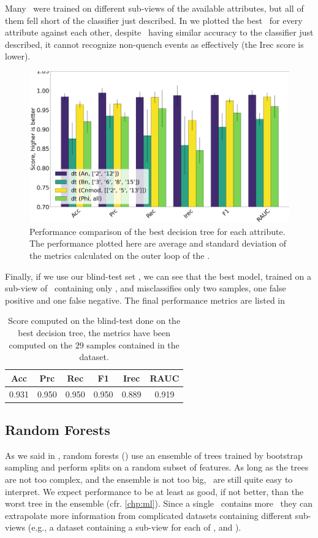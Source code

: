 Many \dts\ were trained on different sub-views of the available attributes, but all of them fell short
of the classifier just described. In  we plotted the best \dt\ for every
attribute against each other, despite \cnmod\ having similar accuracy to the classifier just
described, it cannot recognize non-quench events as effectively (the Irec score is lower).
\begin{figure}[!ht]
	\centering
	\includegraphics[width=0.7\linewidth]{img/best_dts.png}
	\caption{Performance comparison of the best decision tree for each attribute. The
		performance plotted here are average and standard deviation of the metrics calculated on the
		outer loop of the \ncv.} \label{fig:best-dts}
\end{figure}

Finally, if we use our blind-test set \db, we can see that the best model, trained on a sub-view of
\an\ containing only \an[2], and \an[12] misclassifies only two samples, one false positive and one
false negative. The final performance metrics are listed in 
\begin{table}[!ht]
	\setlength{\tabcolsep}{6pt}
	\centering
	\begin{tabular}{cccccc}
		\toprule
		\textbf{Acc} & \textbf{Prc} & \textbf{Rec} & \textbf{F1} & \textbf{Irec} & \textbf{RAUC} \\
		\midrule
		0.931        & 0.950        & 0.950        & 0.950       & 0.889         & 0.919         \\
		\bottomrule
	\end{tabular}
	\caption{Score computed on the blind-test done on the best decision tree, the metrics have
		been computed on the $29$ samples contained in the dataset.}\label{tbl:blind-test-bdt}
\end{table}

\subsection{Random Forests}
\label{sec:qrp-rf}
As we said in , random forests (\rfs) use an ensemble of trees trained by bootstrap
sampling and perform splits on a random subset of features. As long as the trees are not too
complex, and the ensemble is not too big, \rfs\ are still quite easy to interpret. We expect
performance to be at least as good, if not better, than the worst tree in the ensemble (cfr.
\cref{chp:ml}). Since a single \rf\ contains more \dts\, they can extrapolate more information from
complicated datasets containing different sub-views (e.g., a dataset containing a sub-view for each
of \an, \bn and \cnmod).

